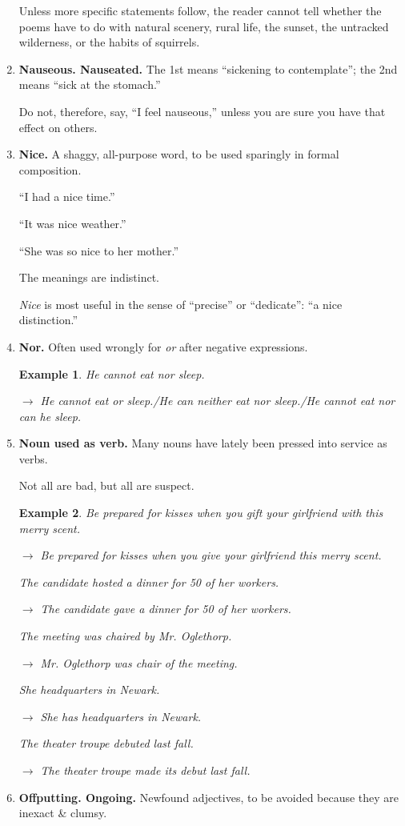 \documentclass{article}
\newtheorem{example}{Example}
\begin{document}
\begin{enumerate}
	Unless more specific statements follow, the reader cannot tell whether the poems have to do with natural scenery, rural life, the sunset, the untracked wilderness, or the habits of squirrels.
	\item {\bf Nauseous. Nauseated.} The 1st means ``sickening to contemplate''; the 2nd means ``sick at the stomach.''
	
	Do not, therefore, say, ``I feel nauseous,'' unless you are sure you have that effect on others.
	\item {\bf Nice.} A shaggy, all-purpose word, to be used sparingly in formal composition.
	
	``I had a nice time.''
	
	``It was nice weather.''
	
	``She was so nice to her mother.''
	
	The meanings are indistinct.
	
	{\it Nice} is most useful in the sense of ``precise'' or ``dedicate'': ``a nice distinction.''
	\item {\bf Nor.} Often used wrongly for {\it or} after negative expressions.
	\begin{example}
		He cannot eat nor sleep.
		
		$\to$ He cannot eat or sleep./He can neither eat nor sleep./He cannot eat nor can he sleep.
	\end{example}
	\item {\bf Noun used as verb.} Many nouns have lately been pressed into service as verbs.
	
	Not all are bad, but all are suspect.
	\begin{example}
		Be prepared for kisses when you gift your girlfriend with this merry scent.
		
		$\to$ Be prepared for kisses when you give your girlfriend this merry scent.
		
		The candidate hosted a dinner for 50 of her workers.
		
		$\to$ The candidate gave a dinner for 50 of her workers.
		
		The meeting was chaired by Mr. Oglethorp.
		
		$\to$ Mr. Oglethorp was chair of the meeting.
		
		She headquarters in Newark.
		
		$\to$ She has headquarters in Newark.
		
		The theater troupe debuted last fall.
		
		$\to$ The theater troupe made its debut last fall.
	\end{example}
	\item {\bf Offputting. Ongoing.} Newfound adjectives, to be avoided because they are inexact \& clumsy.
	

\end{enumerate}
\end{document}
